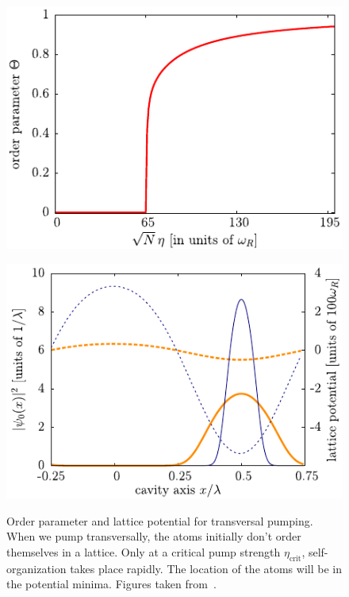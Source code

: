 \begin{figure}[!htb]
	\begin{minipage}[b]{.5\linewidth}
	\centering
	\includegraphics[width=1\linewidth]{images/order-parameter.pdf}
	\label{order_parameter}
	\end{minipage}
%
	\begin{minipage}[b]{.5\linewidth}
	\centering
	\includegraphics[width=1\linewidth]{images/lattice-potential.pdf}
	\label{lattice_potential}
	\end{minipage}
\caption{Order parameter and lattice potential for transversal pumping. When we pump transversally, the atoms initially don't order themselves in a lattice. Only at a critical pump strength $\eta_\text{crit}$, self-organization takes place rapidly. The location of the atoms will be in the potential minima. Figures taken from~\cite{Nagy2008}.}
\label{fig:self-organization}
\end{figure}
\FloatBarrier

